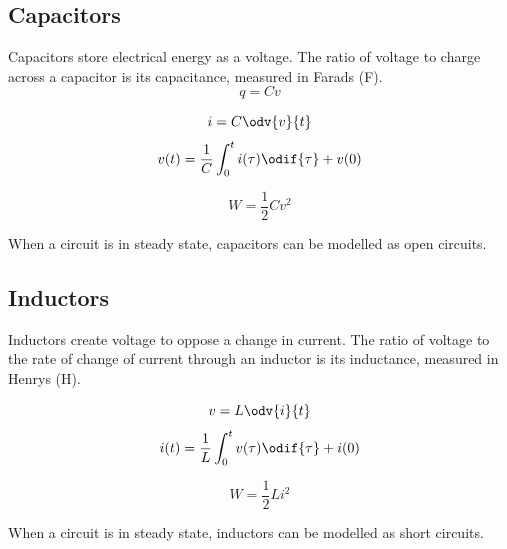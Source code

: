 \documentclass{article}
\begin{document}
\subsection{Capacitors}
\begin{definition}
    Capacitors store electrical energy as a voltage. The ratio of voltage
    to charge across a capacitor is its capacitance, measured in Farads (\unit{\farad}).
    \begin{equation*}
        q = C v
    \end{equation*}
\end{definition}
\begin{definition}[VI relationship]
    \begin{equation*}
        i = C \odv{v}{t}
    \end{equation*}
    \begin{equation*}
        v(t) = \frac{1}{C} \int_0^t i(\tau) \odif{\tau} + v(0)
    \end{equation*}
\end{definition}
\begin{definition}
    \begin{equation*}
        W = \frac{1}{2}Cv^2
    \end{equation*}
\end{definition}
\begin{theorem}
    When a circuit is in steady state, capacitors can be modelled as open circuits.
\end{theorem}
\subsection{Inductors}
\begin{definition}
    Inductors create voltage to oppose a change in current. The ratio of voltage
    to the rate of change of current through an inductor is its inductance, measured in Henrys (\unit{\henry}).
\end{definition}
\begin{definition}[VI relationship]
    \begin{equation*}
        v = L \odv{i}{t}
    \end{equation*}
    \begin{equation*}
        i(t) = \frac{1}{L} \int_0^t v(\tau) \odif{\tau} + i(0)
    \end{equation*}
\end{definition}
\begin{definition}
    \begin{equation*}
        W = \frac{1}{2}Li^2
    \end{equation*}
\end{definition}
\begin{theorem}
    When a circuit is in steady state, inductors can be modelled as short circuits.
\end{theorem}
\newpage
\end{document}

